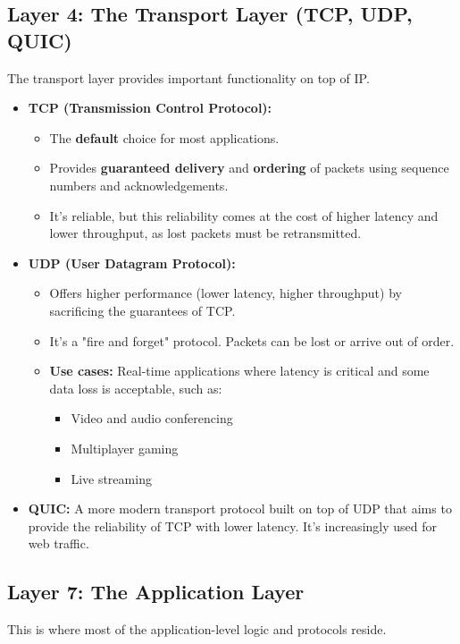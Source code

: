 \documentclass{article}
\begin{document}
\subsection{Layer 4: The Transport Layer (TCP, UDP, QUIC)}
The transport layer provides important functionality on top of IP.
\begin{itemize}
    \item \textbf{TCP (Transmission Control Protocol):}
    \begin{itemize}
        \item The \textbf{default} choice for most applications.
        \item Provides \textbf{guaranteed delivery} and \textbf{ordering} of packets using sequence numbers and acknowledgements.
        \item It's reliable, but this reliability comes at the cost of higher latency and lower throughput, as lost packets must be retransmitted.
    \end{itemize}
    \item \textbf{UDP (User Datagram Protocol):}
    \begin{itemize}
        \item Offers higher performance (lower latency, higher throughput) by sacrificing the guarantees of TCP.
        \item It's a "fire and forget" protocol. Packets can be lost or arrive out of order.
        \item \textbf{Use cases:} Real-time applications where latency is critical and some data loss is acceptable, such as:
        \begin{itemize}
            \item Video and audio conferencing
            \item Multiplayer gaming
            \item Live streaming
        \end{itemize}
    \end{itemize}
    \item \textbf{QUIC:} A more modern transport protocol built on top of UDP that aims to provide the reliability of TCP with lower latency. It's increasingly used for web traffic.
\end{itemize}

\subsection{Layer 7: The Application Layer}
This is where most of the application-level logic and protocols reside.
\end{document}
